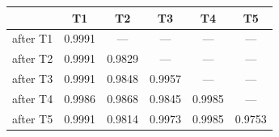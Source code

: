 \begin{tabular}{@{}lccccc@{}}
\toprule
& \textbf{T1} & \textbf{T2} & \textbf{T3} & \textbf{T4} & \textbf{T5} \\
\midrule
after T1 & 0.9991 & --- & --- & --- & --- \\
after T2 & 0.9991 & 0.9829 & --- & --- & --- \\
after T3 & 0.9991 & 0.9848 & 0.9957 & --- & --- \\
after T4 & 0.9986 & 0.9868 & 0.9845 & 0.9985 & --- \\
after T5 & 0.9991 & 0.9814 & 0.9973 & 0.9985 & 0.9753 \\
\bottomrule
\end{tabular}
